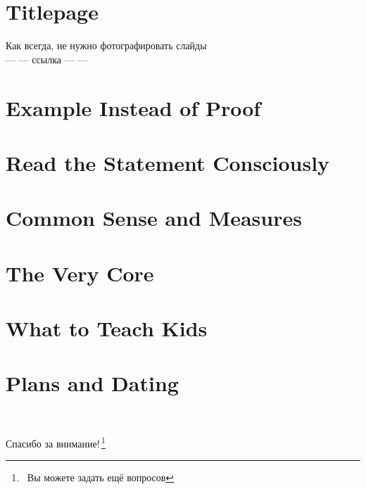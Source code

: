 \documentclass[aspectratio=1610,12pt]{beamer}
\begin{document}
\renewcommand{\thefootnote}{/*\!/}
\section[•]{Titlepage}
\begin{frame}\titlepage\end{frame}

\begin{frame} \begin{center}
	{\Large Как всегда, не нужно фотографировать слайды} \\ [0.6cm]
	{— — ссылка — —}
\end{center} \end{frame}

\section[Доказательство?]{Example Instead of Proof}


\section[Условие?]{Read the Statement Consciously}


\section[Размерности]{Common Sense and Measures}


\section[Суть?]{The Very Core}


\section[Методика]{What to Teach Kids}
\section[Мета]{Plans and Dating}

\renewcommand{\thefootnote}{/*\!/}
\begin{frame}
	\ \\
	\centerline{\huge Спасибо за внимание!\,\footnote{\ Вы можете задать ещё вопросов}}
\end{frame}
\end{document}

